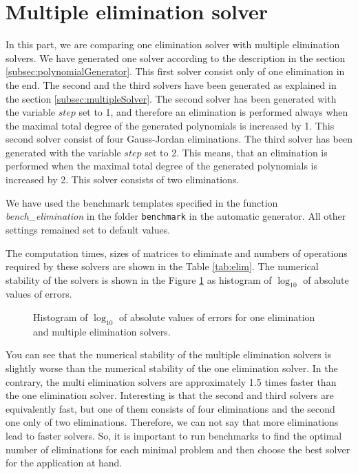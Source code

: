 \section{Multiple elimination solver}
\label{exp:elim}
In this part, we are comparing one elimination solver with multiple elimination solvers. We have generated one solver according to the description in the section \ref{subsec:polynomialGenerator}. This first solver consist only of one elimination in the end. The second and the third solvers have been generated as explained in the section \ref{subsec:multipleSolver}. The second solver has been generated with the variable $step$ set to 1, and therefore an elimination is performed always when the maximal total degree of the generated polynomials is increased by 1. This second solver consist of four Gauss-Jordan eliminations. The third solver has been generated with the variable $step$ set to 2. This means, that an elimination is performed when the maximal total degree of the generated polynomials is increased by 2. This solver consists of two eliminations.

We have used the benchmark templates specified in the function \textit{bench\_elimination} in the folder \texttt{benchmark} in the automatic generator. All other settings remained set to default values.

The computation times, sizes of matrices to eliminate and numbers of operations required by these solvers are shown in the Table \ref{tab:elim}. The numerical stability of the solvers is shown in the Figure \ref{graph:elim} as histogram of $\log_{10}$ of absolute values of errors.

\begin{figure}[ht]
  \centering
  \resizebox{0.95\textwidth}{!}{}
  \caption{Histogram of $\log_{10}$ of absolute values of errors for one elimination and multiple elimination solvers.}
  \label{graph:elim}
\end{figure}

You can see that the numerical stability of the multiple elimination solvers is slightly worse than the numerical stability of the one elimination solver. In the contrary, the multi elimination solvers are approximately 1.5 times faster than the one elimination solver. Interesting is that the second and third solvers are equivalently fast, but one of them consists of four eliminations and the second one only of two eliminations. Therefore, we can not say that more eliminations lead to faster solvers. So, it is important to run benchmarks to find the optimal number of eliminations for each minimal problem and then choose the best solver for the application at hand.

